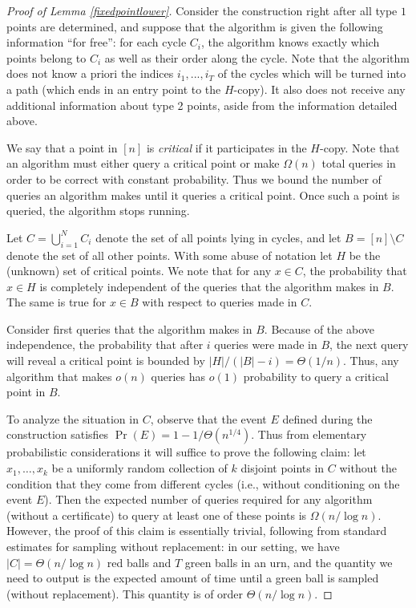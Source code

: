 \documentclass[11pt]{article}
\numberwithin{equation}{section}
\newcommand{\1}{\mathbf{1}}
\begin{document}
\begin{proof}[Proof of Lemma \ref{fixedpointlower}]
Consider the construction right after all type $1$ points are determined, and suppose that the algorithm is given the following information ``for free'': for each cycle
$C_i$, the algorithm knows exactly which points belong to $C_i$ as well as their order along the cycle.
Note that the algorithm does not know a priori the indices $i_1,...,i_T$ of the cycles which will be turned into a path (which ends in an entry point to the $H$-copy). It also does not receive any additional information about type 2 points, aside from the information detailed above.



We say that a point in $[n]$ is \emph{critical} if it participates in the $H$-copy. Note that an algorithm must either query a critical point or make $\Omega(n)$ total queries in order to be correct with constant probability. Thus we bound the number of queries an algorithm makes until it queries a critical point. Once such a point is queried, the algorithm stops running.

Let $C = \bigcup_{i=1}^{N} C_i$ denote the set of all points lying in cycles, and let $B = [n] \setminus C$ denote the set of all other points. With some abuse of notation let $H$ be the (unknown) set of critical points. We note that for any $x \in C$, the probability that $x \in H$ is completely independent of the queries that the algorithm makes in $B$. The same is true for $x \in B$ with respect to queries made in $C$.

Consider first queries that the algorithm makes in $B$. Because of the above independence, the probability that after $i$ queries were made in $B$, the next query will reveal a critical point is bounded by $|H| / (|B|-i) = \Theta(1/n)$. Thus, any algorithm that makes $o(n)$ queries has $o(1)$ probability to query a critical point in $B$. 

\newcommand{\ALONG}{{A_{\text{long}}}}
\newcommand{\ASHORT}{{A_{\text{short}}}}

To analyze the situation in $C$, observe that the event $E$ defined during the construction satisfies $\Pr(E) = 1-1/\Theta(n^{1/4})$. Thus from elementary probabilistic considerations it will suffice to prove the following claim: let $x_1, \ldots, x_k$ be a uniformly random collection of $k$ disjoint points in $C$ without the condition that they come from different cycles (i.e., without conditioning on the event $E$). Then the expected number of queries required for any algorithm (without a certificate) to query at least one of these points is $\Omega(n/\log n)$. However, the proof of this claim is essentially trivial, following from standard estimates for sampling without replacement: in our setting, we have $|C| = \Theta(n / \log n)$ red balls and $T$ green balls in an urn, and the quantity we need to output is the expected amount of time until a green ball is sampled (without replacement). This quantity is of order $\Theta(n / \log n)$.
\end{proof}
\end{document}
